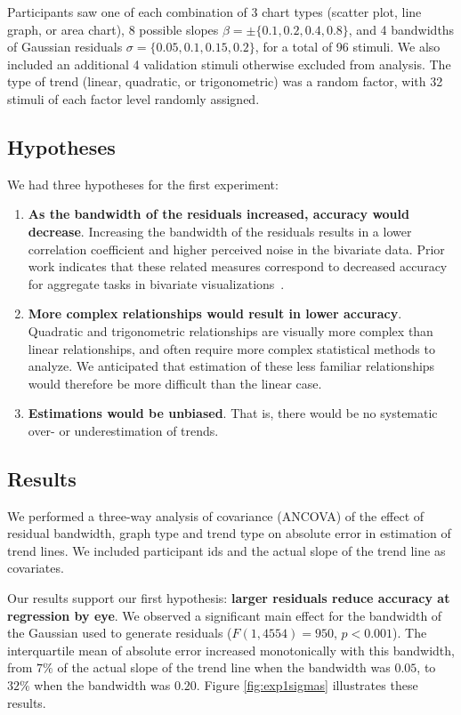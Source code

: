 \documentclass{sigchi}
\begin{document}
Participants saw one of each combination of 3 chart types (scatter plot, line graph, or area chart), 8 possible slopes $\beta = \pm \{0.1,0.2,0.4,0.8\}$, and 4 bandwidths of Gaussian residuals $\sigma = \{0.05,0.1,0.15,0.2\}$, for a total of 96 stimuli. We also included an additional 4 validation stimuli otherwise excluded from analysis. The type of trend (linear, quadratic, or trigonometric) was a random factor, with 32 stimuli of each factor level randomly assigned.

\subsection{Hypotheses}

We had three hypotheses for the first experiment:
\begin{enumerate}
	\item \textbf{As the bandwidth of the residuals increased, accuracy would decrease}. Increasing the bandwidth of the residuals results in a lower correlation coefficient and higher perceived noise in the bivariate data. Prior work indicates that these related measures correspond to decreased accuracy for aggregate tasks in bivariate visualizations~\cite{albers2014task, harrison2014ranking}.
	\item \textbf{More complex relationships would result in lower accuracy}. Quadratic and trigonometric relationships are visually more complex than linear relationships, and often require more complex statistical methods to analyze. We anticipated that estimation of these less familiar relationships would therefore be more difficult than the linear case.
	\item \textbf{Estimations would be unbiased}. That is, there would be no systematic over- or underestimation of trends.
\end{enumerate}

\subsection{Results}
We performed a three-way analysis of covariance (ANCOVA) of the effect of residual bandwidth, graph type and trend type on absolute error in estimation of trend lines. We included participant ids and the actual slope of the trend line as covariates.

Our results support our first hypothesis: \textbf{larger residuals reduce accuracy at regression by eye}.  We observed a significant main effect for the bandwidth of the Gaussian used to generate residuals ($F(1,4554)=950$, $p<0.001$). The interquartile mean of absolute error increased monotonically with this bandwidth, from $7\%$ of the actual slope of the trend line when the bandwidth was $0.05$, to $32\%$ when the bandwidth was $0.20$. Figure \ref{fig:exp1sigmas} illustrates these results.
\end{document}
